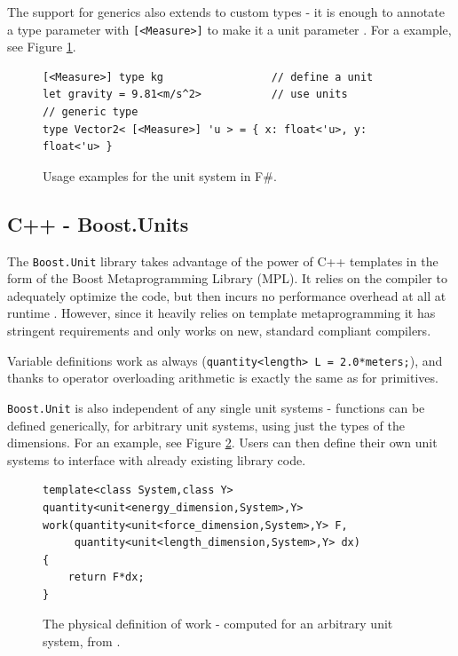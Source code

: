 \documentclass[12pt,oneside,a4paper]{scrbook}
\begin{document}
The support for generics also extends to custom types - it is enough to annotate a type parameter with \verb/[<Measure>]/ to make it a unit parameter \citep{Kennedy08:4}. For a example, see Figure \ref{code:fsharp}.


\begin{figure}
\begin{verbatim}
[<Measure>] type kg                 // define a unit
let gravity = 9.81<m/s^2>           // use units
// generic type
type Vector2< [<Measure>] 'u > = { x: float<'u>, y: float<'u> }
\end{verbatim}
\caption{Usage examples for the unit system in F\#.}
\label{code:fsharp}
\end{figure}

\subsection{C++ - Boost.Units}

The \verb/Boost.Unit/ library takes advantage of the power of C++ templates in the form of the Boost Metaprogramming Library (MPL).  It relies on the compiler to adequately optimize the code, but then incurs no performance overhead at all at runtime \citep{Schabel10}. However, since it heavily relies on template metaprogramming it has stringent requirements and only works on new, standard compliant compilers.

Variable definitions work as always (\verb/quantity<length> L = 2.0*meters;/), and thanks to operator overloading arithmetic is exactly the same as for primitives.

\verb/Boost.Unit/ is also independent of any single unit systems - functions can be defined generically, for arbitrary unit systems, using just the types of the dimensions. For an example, see Figure \ref{code:boost_units_generic}. Users can then define their own unit systems to interface with already existing library code.

\begin{figure}
\begin{verbatim}
template<class System,class Y>
quantity<unit<energy_dimension,System>,Y>
work(quantity<unit<force_dimension,System>,Y> F,
     quantity<unit<length_dimension,System>,Y> dx)
{
    return F*dx;
}
\end{verbatim}
\caption{The physical definition of work - computed for an arbitrary unit system, from \citep{Schabel10}.}
\label{code:boost_units_generic}
\end{figure}
\end{document}
